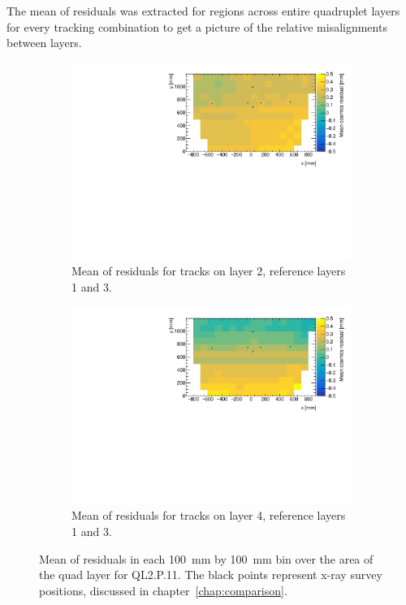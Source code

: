 The mean of residuals was extracted for regions across entire quadruplet layers for every tracking combination to get a picture of the relative misalignments between layers. 

\begin{figure}
\centering
\begin{subfigure}{0.85\textwidth}
  \centering
  \includegraphics[width=\linewidth]{figures/figure_QL2P11_3100V_2021-08-05_fit_means_xray_overlay_layer2_fixedlayers13.pdf}
  \caption{Mean of residuals for tracks on layer 2, reference layers 1 and 3.}
  \label{fig:res_mean_th2_L2_F13}
\end{subfigure}%
\vspace*{\floatsep}
\begin{subfigure}{0.85\textwidth}
  \centering
  \includegraphics[width=\linewidth]{figures/figure_QL2P11_3100V_2021-08-05_fit_means_xray_overlay_layer4_fixedlayers13.pdf}
  \caption{Mean of residuals for tracks on layer 4, reference layers 1 and 3.}
  \label{fig:res_mean_th2_L4_F13}
\end{subfigure}
\caption{Mean of residuals in each \SI{100}{\milli\meter} by \SI{100}{\milli\meter} bin over the area of the quad layer for QL2.P.11. The black points represent x-ray survey positions, discussed in chapter~\ref{chap:comparison}.}
\label{fig:res_mean_th2}
\end{figure}

